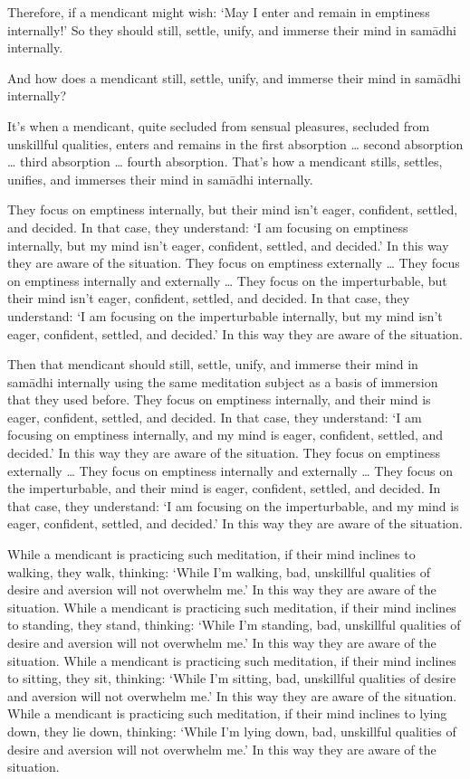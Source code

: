 \documentclass[12pt,openany]{book}%
\begin{document}
Therefore, if a mendicant might wish: ‘May I enter and remain in emptiness internally!’ So they should still, settle, unify, and immerse their mind in \textsanskrit{samādhi} internally. 

And how does a mendicant still, settle, unify, and immerse their mind in \textsanskrit{samādhi} internally? 

It’s when a mendicant, quite secluded from sensual pleasures, secluded from unskillful qualities, enters and remains in the first absorption … second absorption … third absorption … fourth absorption. That’s how a mendicant stills, settles, unifies, and immerses their mind in \textsanskrit{samādhi} internally. 

They focus on emptiness internally, but their mind isn’t eager, confident, settled, and decided. In that case, they understand: ‘I am focusing on emptiness internally, but my mind isn’t eager, confident, settled, and decided.’ In this way they are aware of the situation. They focus on emptiness externally … They focus on emptiness internally and externally … They focus on the imperturbable, but their mind isn’t eager, confident, settled, and decided. In that case, they understand: ‘I am focusing on the imperturbable internally, but my mind isn’t eager, confident, settled, and decided.’ In this way they are aware of the situation. 

Then that mendicant should still, settle, unify, and immerse their mind in \textsanskrit{samādhi} internally using the same meditation subject as a basis of immersion that they used before. They focus on emptiness internally, and their mind is eager, confident, settled, and decided. In that case, they understand: ‘I am focusing on emptiness internally, and my mind is eager, confident, settled, and decided.’ In this way they are aware of the situation. They focus on emptiness externally … They focus on emptiness internally and externally … They focus on the imperturbable, and their mind is eager, confident, settled, and decided. In that case, they understand: ‘I am focusing on the imperturbable, and my mind is eager, confident, settled, and decided.’ In this way they are aware of the situation. 

While a mendicant is practicing such meditation, if their mind inclines to walking, they walk, thinking: ‘While I’m walking, bad, unskillful qualities of desire and aversion will not overwhelm me.’ In this way they are aware of the situation. While a mendicant is practicing such meditation, if their mind inclines to standing, they stand, thinking: ‘While I’m standing, bad, unskillful qualities of desire and aversion will not overwhelm me.’ In this way they are aware of the situation. While a mendicant is practicing such meditation, if their mind inclines to sitting, they sit, thinking: ‘While I’m sitting, bad, unskillful qualities of desire and aversion will not overwhelm me.’ In this way they are aware of the situation. While a mendicant is practicing such meditation, if their mind inclines to lying down, they lie down, thinking: ‘While I’m lying down, bad, unskillful qualities of desire and aversion will not overwhelm me.’ In this way they are aware of the situation. 
\end{document}
